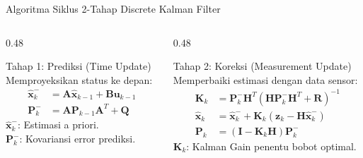\documentclass[aspectratio=169, 10pt]{beamer}
\begin{document}
\begin{frame}{Algoritma Siklus 2-Tahap Discrete Kalman Filter}
    \begin{columns}[T]
        \begin{column}{0.48\textwidth}
            \begin{block}{Tahap 1: Prediksi (Time Update)}
                Memproyeksikan status ke depan:
                \begin{equation*}
                \begin{aligned}
                    \hat{\mathbf{x}}_k^- &= \mathbf{A}\hat{\mathbf{x}}_{k-1} + \mathbf{B}\mathbf{u}_{k-1} \\
                    \mathbf{P}_k^- &= \mathbf{A}\mathbf{P}_{k-1}\mathbf{A}^T + \mathbf{Q}
                \end{aligned}
                \end{equation*}
                $\hat{\mathbf{x}}_k^-$: Estimasi a priori.\\
                $\mathbf{P}_k^-$: Kovariansi error prediksi.
            \end{block}
        \end{column}
        \begin{column}{0.48\textwidth}
            \begin{block}{Tahap 2: Koreksi (Measurement Update)}
                Memperbaiki estimasi dengan data sensor:
                \begin{equation*}
                \begin{aligned}
                    \mathbf{K}_k &= \mathbf{P}_k^-\mathbf{H}^T(\mathbf{H}\mathbf{P}_k^-\mathbf{H}^T + \mathbf{R})^{-1} \\
                    \hat{\mathbf{x}}_k &= \hat{\mathbf{x}}_k^- + \mathbf{K}_k(\mathbf{z}_k - \mathbf{H}\hat{\mathbf{x}}_k^-) \\
                    \mathbf{P}_k &= (\mathbf{I} - \mathbf{K}_k\mathbf{H})\mathbf{P}_k^-
                \end{aligned}
                \end{equation*}
                $\mathbf{K}_k$: Kalman Gain penentu bobot optimal.
            \end{block}
        \end{column}
    \end{columns}
\end{frame}
\end{document}
